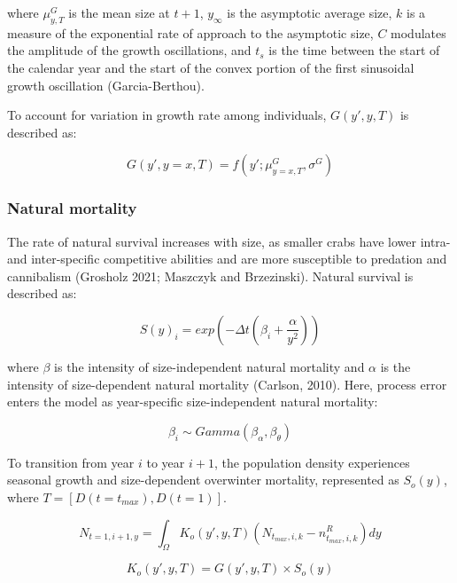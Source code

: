 \documentclass{article}
\begin{document}
where $\mu^G_{y,T}$ is the mean size at $t+1$, $y_{\infty}$ is the asymptotic average size, $k$ is a measure of the exponential rate of approach to the asymptotic size, $C$ modulates the amplitude of the growth oscillations, and $t_s$ is the time between the start of the calendar year and the start of the convex portion of the first sinusoidal growth oscillation (Garcia-Berthou).

To account for variation in growth rate among individuals, $G(y',y, T)$ is described as:

\begin{equation}
G(y',y=x, T) = f(y'; \mu^G_{y=x, T}, \sigma^G)
\end{equation}

\subsubsection*{Natural mortality}

The rate of natural survival increases with size, as smaller crabs have lower intra- and inter-specific competitive abilities and are more susceptible to predation and cannibalism (Grosholz 2021; Maszczyk and Brzezinski). Natural survival is described as: 

\begin{equation}
S(y)_i = exp(-\Delta t(\beta_i+\frac{\alpha}{y^2}))
\end{equation}

where $\beta$ is the intensity of size-independent natural mortality and $\alpha$ is the intensity of size-dependent natural mortality (Carlson, 2010). Here, process error enters the model as year-specific size-independent natural mortality:

\begin{equation}
\beta_i \sim Gamma(\beta_{\alpha}, \beta_{\theta})
\end{equation}

To transition from year $i$ to year $i+1$, the population density experiences seasonal growth and size-dependent overwinter mortality, represented as $S_o(y)$, where $T=[D(t=t_{max}), D(t=1)]$. 

\begin{equation}
N_{t=1,i+1,y} = \int_{\Omega} K_o(y',y, T) (N_{t_{max},i,k} - n^R_{t_{max},i,k}) dy 
\end{equation}

\begin{equation}
K_o(y',y, T) = G(y',y, T) \times S_o(y)
\end{equation}
\end{document}
